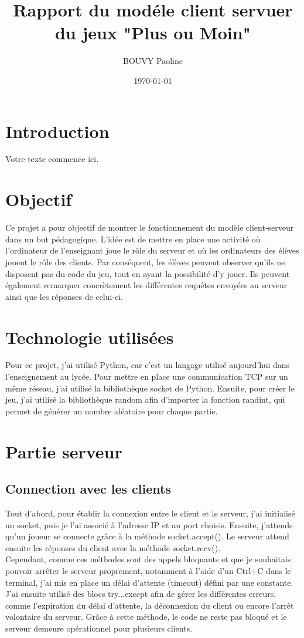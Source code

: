 \documentclass[12pt,a4paper]{article}
\title{\textbf{Rapport du modéle client servuer du jeux "Plus ou Moin"}}
\author{BOUVY Paoline}
\date{\today}
\begin{document}
\maketitle
\newpage

\tableofcontents
\newpage

\section{Introduction}

Votre texte commence ici.
\section{Objectif}
Ce projet a pour objectif de montrer le fonctionnement du modèle client-serveur dans un but pédagogique. L’idée est de mettre en place une activité où l’ordinateur de l’enseignant joue le rôle du serveur et où les ordinateurs des élèves jouent le rôle des clients. Par conséquent, les élèves peuvent observer qu’ils ne disposent pas du code du jeu, tout en ayant la possibilité d’y jouer. Ils peuvent également remarquer concrètement les différentes requêtes envoyées au serveur ainsi que les réponses de celui-ci.

\section{Technologie utilisées}
Pour ce projet, j’ai utilisé Python, car c’est un langage utilisé aujourd’hui dans l’enseignement au lycée. Pour mettre en place une communication TCP sur un même réseau, j’ai utilisé la bibliothèque socket de Python.
Ensuite, pour créer le jeu, j’ai utilisé la bibliothèque random afin d’importer la fonction randint, qui permet de générer un nombre aléatoire pour chaque partie.

\section{Partie serveur}
\subsection{Connection avec les clients}
Tout d’abord, pour établir la connexion entre le client et le serveur, j’ai initialisé un socket, puis je l’ai associé à l’adresse IP et au port choisis. Ensuite, j’attends qu’un joueur se connecte grâce à la méthode socket.accept(). Le serveur attend ensuite les réponses du client avec la méthode socket.recv().\\
Cependant, comme ces méthodes sont des appels bloquants et que je souhaitais pouvoir arrêter le serveur proprement, notamment à l’aide d’un Ctrl+C dans le terminal, j’ai mis en place un délai d’attente (timeout) défini par une constante.\\
J’ai ensuite utilisé des blocs try...except afin de gérer les différentes erreurs, comme l’expiration du délai d’attente, la déconnexion du client ou encore l’arrêt volontaire du serveur. Grâce à cette méthode, le code ne reste pas bloqué et le serveur demeure opérationnel pour plusieurs clients.
\end{document}
